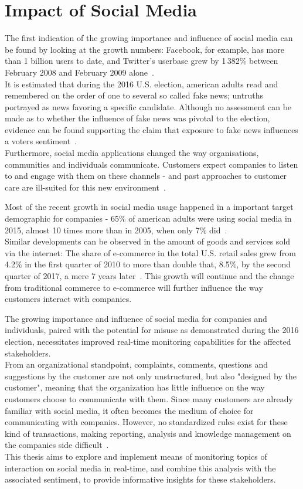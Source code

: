 \section{Impact of Social Media}
\label{sec:developmentOfSocialMedia}

The first indication of the growing importance and influence of social media can be found by looking at the growth numbers:
Facebook, for example, has more than 1 billion users to date,
and Twitter's userbase grew by 1\,382\% between February 2008 and February 2009 alone~\cite{mcgiboney2009twitter}.\\
It is estimated that during the 2016 U.S. election, american adults read and remembered on the order of one to several so called fake news;
untruths portrayed as news favoring a specific candidate.
Although no assessment can be made as to whether the influence of fake news was pivotal to the election,
evidence can be found supporting the claim that exposure to fake news influences a voters sentiment~\cite{Allcott2017}.\\
Furthermore, social media applications changed the way organisations, communities and individuals communicate.
Customers expect companies to listen to and engage with them on these channels -
and past approaches to customer care are ill-suited for this new environment~\cite{Kietzmann2011}.

Most of the recent growth in social media usage happened in a important target demographic for companies -
65\% of american adults were using social media in 2015, almost 10 times more than in 2005, when only 7\% did~\cite{Perrin2015}.\\
Similar developments can be observed in the amount of goods and services sold via the internet:
The share of e-commerce in the total U.S. retail sales grew from 4.2\% in the first quarter of 2010 to more than double that, 8.5\%,
by the second quarter of 2017, a mere 7 years later~\cite{statistaECommerceGrowth}.
This growth will continue and the change from traditional commerce to e-commerce
will further influence the way customers interact with companies.

The growing importance and influence of social media for companies and individuals,
paired with the potential for misuse as demonstrated during the 2016 election,
necessitates improved real-time monitoring capabilities for the affected stakeholders.\\
From an organizational standpoint, complaints, comments, questions and suggestions by the customer are not only unstructured,
but also "designed by the customer", meaning that the organization has little influence on the way customers choose to communicate with them.
Since many customers are already familiar with social media, it often becomes the medium of choice for communicating with companies.
However, no standardized rules exist for these kind of transactions, making reporting, analysis and knowledge management on the companies side difficult~\cite{Culnan2015}.\\
This thesis aims to explore and implement means of monitoring topics of interaction on social media in real-time,
and combine this analysis with the associated sentiment, to provide informative insights for these stakeholders.

